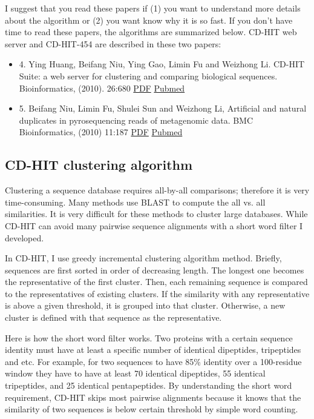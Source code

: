 \documentclass[12pt,a4paper]{article}
\begin{document}
I suggest that you read these papers if (1) you want to understand more details about the algorithm or (2) you want know why it is so fast. If you don't have time to read these papers, the algorithms are summarized below. CD-HIT web server and CD-HIT-454 are described in these two papers:

\begin{itemize}
 \item 4. Ying Huang, Beifang Niu, Ying Gao, Limin Fu and Weizhong Li. CD-HIT Suite: a web server for clustering and comparing biological sequences. Bioinformatics, (2010). 26:680 \href{http:\slash \slash bioinformatics.oxfordjournals.org\slash cgi\slash reprint\slash btq003v1}{PDF} \href{http:\slash \slash www.ncbi.nlm.nih.gov\slash pubmed\slash 20053844}{Pubmed}

\item 5. Beifang Niu, Limin Fu, Shulei Sun and Weizhong Li, Artificial and natural duplicates in pyrosequencing reads of metagenomic data. BMC Bioinformatics, (2010) 11:187 \href{http:\slash \slash www.biomedcentral.com\slash content\slash pdf\slash 1471-2105-11-187.pdf}{PDF} \href{http:\slash \slash www.ncbi.nlm.nih.gov\slash pubmed\slash 20388221}{Pubmed}

\end{itemize}

\subsection{CD-HIT clustering algorithm }

Clustering a sequence database requires all-by-all comparisons; therefore it is very time-consuming. Many methods use BLAST to compute the all vs. all similarities. It is very difficult for these methods to cluster large databases. While CD-HIT can avoid many pairwise sequence alignments with a short word filter I developed.

In CD-HIT, I use greedy incremental clustering algorithm method. Briefly, sequences are first sorted in order of decreasing length. The longest one becomes the representative of the first cluster. Then, each remaining sequence is compared to the representatives of existing clusters. If the similarity with any representative is above a given threshold, it is grouped into that cluster. Otherwise, a new cluster is defined with that sequence as the representative.

Here is how the short word filter works. Two proteins with a certain sequence identity must have at least a specific number of identical dipeptides, tripeptides and etc. For example, for two sequences to have 85\% identity over a 100-residue window they have to have at least 70 identical dipeptides, 55 identical tripeptides, and 25 identical pentapeptides. By understanding the short word requirement, CD-HIT skips most pairwise alignments because it knows that the similarity of two sequences is below certain threshold by simple word counting. 
\end{document}
